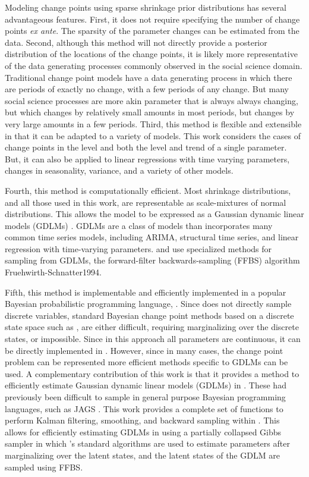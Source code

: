 Modeling change points using sparse shrinkage prior distributions has several advantageous features.
First, it does not require specifying the number of change points \textit{ex ante}.
The sparsity of the parameter changes can be estimated from the data. 
Second, although this method will not directly provide a posterior distribution of the locations of the change points, it is likely more representative of the data generating processes commonly observed in the social science domain.
Traditional change point models have a data generating process in which there are periods of exactly no change, with a few periods of any change.
But many social science processes are more akin parameter that is always always changing, but which changes by relatively small amounts in most periods, but changes by very large amounts in a few periods.
Third, this method is flexible and extensible in that it can be adapted to a variety of models.
This work considers the cases of change points in the level and both the level and trend of a single parameter. 
But, it can also be applied to linear regressions with time varying parameters, changes in seasonality, variance, and a variety of other models.

Fourth, this method is computationally efficient.
Most shrinkage distributions, and all those used in this work, are representable as scale-mixtures of normal distributions.
This allows the model to be expressed as a Gaussian dynamic linear models (GDLMs) \parencite{WestHarrison1997}.
GDLMs are a class of models than incorporates many common time series models, including ARIMA, structural time series, and linear regression with time-varying parameters.
and use specialized methods for sampling from GDLMs, \eg{} the forward-filter backwards-sampling (FFBS) algorithm \parencite{CarterKohn1994}{Fruehwirth-Schnatter1994}.

Fifth, this method is implementable and efficiently implemented in a popular Bayesian probabilistic programming language, \Stan{}.
Since \Stan{} does not directly sample discrete variables, standard Bayesian change point methods based on a discrete state space such as \parencite{Chib1998}, are either difficult, requiring marginalizing over the discrete states, or impossible.
Since in this approach all parameters are continuous, it can be directly implemented in \Stan{}.
However, since in many cases, the change point problem can be represented more efficient methods specific to GDLMs can be used.
A complementary contribution of this work is that it provides a method to efficiently estimate Gaussian dynamic linear models (GDLMs) in \Stan{}.
These had previously been difficult to sample in general purpose Bayesian programming languages, such as JAGS \parencite[477]{Jackman2009}.
This work provides a complete set of functions to perform Kalman filtering, smoothing, and backward sampling within \Stan{}.
This allows for efficiently estimating GDLMs in \Stan{} using a partially collapsed Gibbs sampler in which \Stan{}'s standard algorithms are used to estimate parameters after marginalizing over the latent states, and the latent states of the GDLM are sampled using FFBS.

